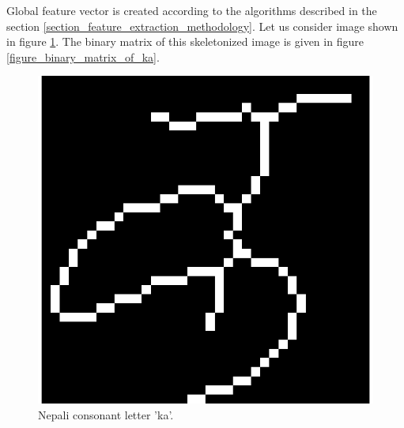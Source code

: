 Global feature vector is created according to the algorithms described in the section \ref{section_feature_extraction_methodology}. Let us consider image shown in figure \ref{figure_ka}. The binary matrix of this skeletonized image is given in figure \ref{figure_binary_matrix_of_ka}. 

\begin{figure}[ht]
\begin{minipage}[b]{0.5\linewidth}%
\centering
\includegraphics[scale=0.35]{figures/ka_features/ka.eps}
\caption{Nepali consonant letter 'ka'.}
\label{figure_ka}
\end{minipage}
\hspace{0.5cm}
\begin{minipage}[b]{0.5\linewidth}%
\centering

\end{minipage}
\end{figure}
